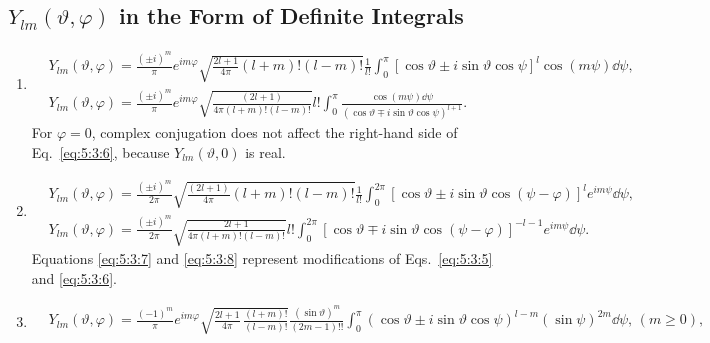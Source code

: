 \subsection{$Y_{l m}(\vartheta, \varphi)$ in the Form of Definite Integrals}\label{sec:5.3.2}
\begin{enumerate}[label=(\alph*)]
  \item
\begin{align}
& Y_{l m}(\vartheta, \varphi)=\frac{( \pm i)^{m}}{\pi} e^{i m \varphi} \sqrt{\frac{2 l+1}{4 \pi}(l+m)!(l-m)!} \frac{1}{l!} \int_{0}^{\pi}[\cos \vartheta \pm i \sin \vartheta \cos \psi]^{l} \cos (m \psi) \dd \psi , \label{eq:5:3:5}\\
& Y_{l m}(\vartheta, \varphi)=\frac{( \pm i)^{m}}{\pi} e^{i m \varphi} \sqrt{\frac{(2 l+1)}{4 \pi(l+m)!(l-m)!}} l!\int_{0}^{\pi} \frac{\cos (m \psi) \dd \psi}{(\cos \vartheta \mp i \sin \vartheta \cos \psi)^{l+1}} .\label{eq:5:3:6}
\end{align}
For $\varphi=0$, complex conjugation does not affect the right-hand side of Eq.~\eqref{eq:5:3:6}, because $Y_{l m}(\vartheta, 0)$ is real.\\
\item
\begin{align}
& Y_{l m}(\vartheta, \varphi)=\frac{( \pm i)^{m}}{2 \pi} \sqrt{\frac{(2 l+1)}{4 \pi}(l+m)!(l-m)!} \frac{1}{l!} \int_{0}^{2 \pi}[\cos \vartheta \pm i \sin \vartheta \cos (\psi-\varphi)]^{l} e^{i m \psi} \dd \psi , \label{eq:5:3:7}\\
& Y_{l m}(\vartheta, \varphi)=\frac{( \pm i)^{m}}{2 \pi} \sqrt{\frac{2 l+1}{4 \pi(l+m)!(l-m)!}} l!\int_{0}^{2 \pi}[\cos \vartheta \mp i \sin \vartheta \cos (\psi-\varphi)]^{-l-1} e^{i m \psi} \dd \psi. \label{eq:5:3:8}
\end{align}
Equations \eqref{eq:5:3:7} and \eqref{eq:5:3:8} represent modifications of Eqs.~\eqref{eq:5:3:5} and \eqref{eq:5:3:6}.\\
\item
\begin{align}
& Y_{l m}(\vartheta, \varphi)=\frac{(-1)^{m}}{\pi} e^{i m \varphi} \sqrt{\frac{2 l+1}{4 \pi} \, \frac{(l+m)!}{(l-m)!}} \frac{(\sin \vartheta)^{m}}{(2 m-1)!!} \int_{0}^{\pi}(\cos \vartheta \pm i \sin \vartheta \cos \psi)^{l-m}(\sin \psi)^{2 m} \dd \psi,\,(m \geq 0),  \label{eq:5:3:9}\\

\end{align}
\end{enumerate}

